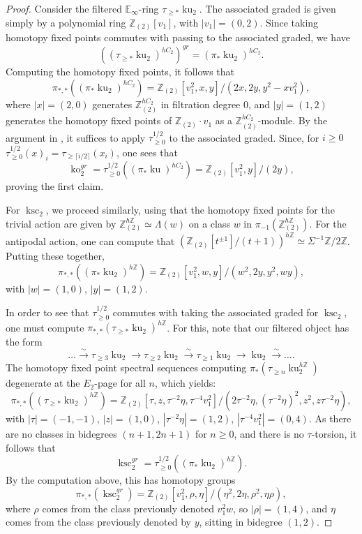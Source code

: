 \documentclass[11pt,leqno]{article}
\newcommand{\zz}{\mathbb{Z}}
\newcommand{\bb}[1]{\mathbb{#1}}
\newcommand{\simto}{\overset{\sim}{\longrightarrow}}
\DeclareMathOperator{\ksc}{ksc}
\DeclareMathOperator{\ko}{ko}
\newcommand{\mo}[1]{\operatorname{#1}}
\newtheorem*{short hand}{theorem name}
\theoremstyle{plain}  %
\theoremstyle{definition}
\numberwithin{equation}{section}
\begin{document}
\begin{proof}
Consider the filtered $\bb{E}_{\infty}$-ring $\tau_{\geq *}\mo{ku}_2$.  The associated graded is given simply by a polynomial ring $\zz_{(2)}[v_1]$, with $|v_1|=(0,2)$.  Since taking homotopy fixed points commutes with passing to the associated graded, we have $$((\tau_{\geq *}\mo{ku}_2)^{hC_2})^{gr}=(\pi_*\mo{ku}_2)^{hC_2}.$$  Computing the homotopy fixed points, it follows that  $$\pi_{*,*}((\pi_*\mo{ku}_2)^{hC_2})=\zz_{(2)}[v_1^2,x,y]/(2x,2y,y^2-xv_1^2),$$ where $|x|=(2,0)$ generates $\zz_{(2)}^{hC_2}$ in filtration degree 0, and $|y|=(1,2)$ generates the homotopy fixed points of $\zz_{(2)}\cdot v_1$ as a $\zz_{(2)}^{hC_2}$-module.  By the argument in \cite[~Lemma 2.16]{lee2023topological}, it suffices to apply $\tau^{1/2}_{\geq 0}$ to the associated graded.  Since, for $i\geq 0$ $\tau^{1/2}_{\geq 0}(x)_i=\tau_{\geq \lceil i/2\rceil}(x_i)$, one sees that $$\ko_2^{gr}=\tau_{\geq 0}^{1/2}((\pi_*\mo{ku})^{hC_2})=\zz_{(2)}[v_1^2,y]/(2y),$$
proving the first claim.

For $\ksc_2$, we proceed similarly, using that the homotopy fixed points for the trivial action are given by $\zz_{(2)}^{h\zz}\simeq \Lambda(w)$ on a class $w$ in $\pi_{-1}(\zz_{(2)}^{h\zz})$.  For the antipodal action, one can compute that $(\zz_{(2)}[t^{\pm 1}]/(t+1))^{h\zz}\simeq \Sigma^{-1}\zz/2\zz$.  Putting these together, $$\pi_{*,*}((\pi_*\mo{ku}_2)^{h\zz})=\zz_{(2)}[v_1^2,w,y]/(w^2,2y,y^2,wy),$$ with $|w|=(1,0)$, $|y|=(1,2)$.

In order to see that $\tau^{1/2}_{\geq 0}$ commutes with taking the associated graded for $\ksc_2$, one must compute $\pi_{*,*}(\tau_{\geq *}\mo{ku}_2)^{h\zz}$.  For this, note that our filtered object has the form $$\ldots \simto\tau_{\geq3} \mo{ku}_2\to\tau_{\geq 2}\mo{ku}_2\simto\tau_{\geq 1}\mo{ku}_2\to\mo{ku}_2\simto\ldots.$$  The homotopy fixed point spectral sequences computing $\pi_*(\tau_{\geq n}\mo{ku}_2^{h\zz})$ degenerate at the $E_2$-page for all $n$, which yields: $$\pi_{*,*}((\tau_{\geq *}\mo{ku}_2)^{h\zz})=\zz_{(2)}[\tau,z,\tau^{-2}\eta,\tau^{-4}v_1^2]/(2\tau^{-2}\eta,(\tau^{-2}\eta)^2,z^2,z\tau^{-2}\eta),$$ with $|\tau|=(-1,-1)$, $|z|=(1,0)$, $|\tau^{-2}\eta|=(1,2)$, $|\tau^{-4}v_1^2|=(0,4)$.  As there are no classes in bidegrees $(n+1,2n+1)$ for $n\geq 0$, and there is no $\tau$-torsion, it follows that $$\ksc_2^{gr}=\tau_{\geq 0}^{1/2}((\pi_*\mo{ku}_2)^{h\zz}).$$  By the computation above, this has homotopy groups $$\pi_{*,*}(\ksc_2^{gr})=\zz_{(2)}[v_1^2,\rho,\eta]/(\eta^2,2\eta,\rho^2,\eta\rho),$$ where $\rho$ comes from the class previously denoted $v_1^2w$, so $|\rho|=(1,4)$, and $\eta$ comes from the class previously denoted by $y$, sitting in bidegree $(1,2)$.
\end{proof}
\end{document}
